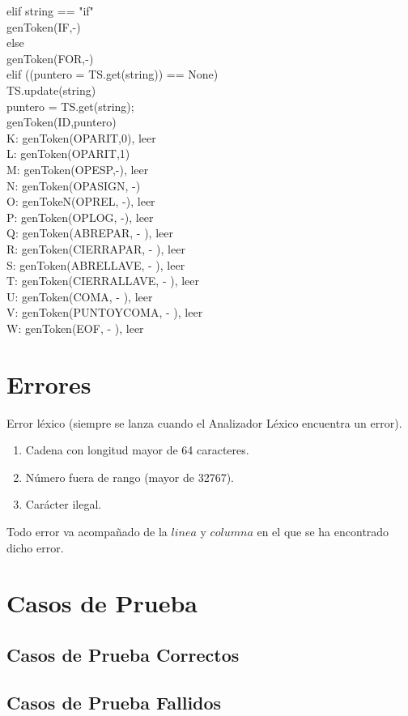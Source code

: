 \documentclass{article}
\begin{document}
\begin{flushleft}
   \qquad     elif string == "if"\\
     \qquad \quad       genToken(IF,-)\\
   \qquad     else\\
      \qquad \quad      genToken(FOR,-)\\
    \quad elif ((puntero = TS.get(string)) == None)\\
         \qquad  TS.update({string})\\
        \qquad    puntero = TS.get(string);\\
         \qquad    genToken(ID,puntero)\\
K: genToken(OPARIT,0), leer\\
L: genToken(OPARIT,1)\\
M: genToken(OPESP,-), leer\\
N: genToken(OPASIGN, -)\\
O: genTokeN(OPREL, -), leer\\
P: genToken(OPLOG, -), leer\\
Q: genToken(ABREPAR, - ), leer\\ 
R: genToken(CIERRAPAR, - ), leer\\
S: genToken(ABRELLAVE, - ), leer\\
T: genToken(CIERRALLAVE, - ), leer\\
U: genToken(COMA, - ), leer\\
V: genToken(PUNTOYCOMA, - ), leer\\
W: genToken(EOF, - ), leer\\
\end{flushleft}
\section{Errores}
Error léxico (siempre se lanza cuando el Analizador Léxico encuentra un error).
\begin{enumerate}
\item Cadena con longitud mayor de 64 caracteres.
\item Número fuera de rango (mayor de 32767).
\item Carácter ilegal. 
\end{enumerate}
Todo error va acompañado de la $linea$ y $columna$ en el que se ha encontrado dicho error.
\section{Casos de Prueba}
\subsection{Casos de Prueba Correctos}
\subsection{Casos de Prueba Fallidos}
\clearpage
\end{document}

